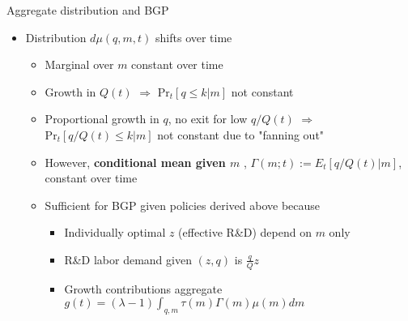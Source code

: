 \documentclass[english,usenames,dvipsnames]{beamer}
\begin{document}
\begin{frame}{Aggregate distribution and BGP}\label{aggregate_distribution_and_bgp}
\hyperlink{closing_the_model}{}
\begin{itemize}
\item Distribution $d\mu(q,m,t)$ shifts over time
\begin{itemize}
\item Marginal over $m$ constant over time
\item Growth in $Q(t)$ $\Rightarrow$ $\textrm{Pr}_t[q \le k | m]$ not constant
\item Proportional growth in $q$, no exit for low $q/Q(t)$ $\Rightarrow$ $\textrm{Pr}_t[q /Q(t)\le k | m]$ not constant due to "fanning out"
\item However, \textbf{\alert{conditional mean given $m$}} , $\Gamma(m;t) := E_t[q/Q(t) | m]$, constant over time
\item Sufficient for BGP given policies derived above because
\begin{itemize}
\item Individually optimal $z$ (effective R\&D) depend on $m$ only
\item R\&D labor demand given $(z,q)$ is $\frac{q}{Q}z$
\item Growth contributions aggregate $g(t) = (\lambda -1)\int_{q,m} \tau(m) \Gamma(m) \mu(m) dm$
\end{itemize}
\end{itemize}
\end{itemize}
\end{frame}
\end{document}
